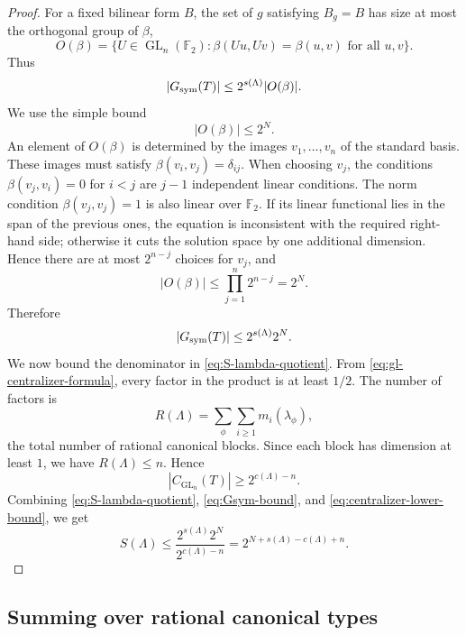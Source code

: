 \documentclass[11pt]{amsart}
\theoremstyle{remark}
\numberwithin{equation}{section}
\newcommand{\F}{\mathbb F}
\newcommand{\GL}{\operatorname{GL}}
\begin{document}
\begin{proof}
For a fixed bilinear form $B$, the set of $g$ satisfying $B_g=B$ has size at most the orthogonal group of $\beta$,
\[
        O(\beta)=\{U\in\GL_n(\F_2):\beta(Uu,Uv)=\beta(u,v)\text{ for all }u,v\}.
\]
Thus
\[
        |G_{\rm sym}(T)|\leq 2^{s(\Lambda)}|O(\beta)|.
\]
We use the simple bound
\begin{equation}\label{eq:orthogonal-bound}
        |O(\beta)|\leq 2^N.
\end{equation}
An element of $O(\beta)$ is determined by the images $v_1,\ldots,v_n$ of the standard basis.  These images must satisfy $\beta(v_i,v_j)=\delta_{ij}$.  When choosing $v_j$, the conditions $\beta(v_j,v_i)=0$ for $i<j$ are $j-1$ independent linear conditions.  The norm condition $\beta(v_j,v_j)=1$ is also linear over $\F_2$.  If its linear functional lies in the span of the previous ones, the equation is inconsistent with the required right-hand side; otherwise it cuts the solution space by one additional dimension.  Hence there are at most $2^{n-j}$ choices for $v_j$, and
\[
        |O(\beta)|\leq\prod_{j=1}^n2^{n-j}=2^N.
\]
Therefore
\begin{equation}\label{eq:Gsym-bound}
        |G_{\rm sym}(T)|\leq 2^{s(\Lambda)}2^N.
\end{equation}
We now bound the denominator in \eqref{eq:S-lambda-quotient}.  From \eqref{eq:gl-centralizer-formula}, every factor in the product is at least $1/2$.  The number of factors is
\[
        R(\Lambda)=\sum_\phi\sum_{i\geq1}m_i(\lambda_\phi),
\]
the total number of rational canonical blocks.  Since each block has dimension at least $1$, we have $R(\Lambda)\leq n$.  Hence
\begin{equation}\label{eq:centralizer-lower-bound}
        |C_{\GL_n}(T)|\geq 2^{c(\Lambda)-n}.
\end{equation}
Combining \eqref{eq:S-lambda-quotient}, \eqref{eq:Gsym-bound}, and \eqref{eq:centralizer-lower-bound}, we get
\[
        S(\Lambda)
        \leq \frac{2^{s(\Lambda)}2^N}{2^{c(\Lambda)-n}}
        =2^{N+s(\Lambda)-c(\Lambda)+n}.
\]
\end{proof}
\subsection{Summing over rational canonical types}
\end{document}
